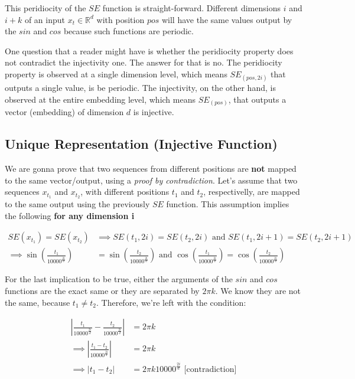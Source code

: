 \documentclass{article}
\begin{document}
This peridiocity of the $SE$ function is straight-forward. Different dimensions $i$ and $i+k$ of an input  $x_t \in \mathbb{R}^{d}$ with position $pos$ will have the same values output by the $sin$ and $cos$ because such functions are periodic. 

\begin{info} %
	One question that a reader might have is whether the peridiocity property does not contradict the injectivity one. The answer for that is no. The peridiocity property is observed at a single dimension level, which means $SE_{(pos, 2i)}$ that outputs a single value, is be periodic. The injectivity, on the other hand, is observed at the entire embedding level, which means $SE_{(pos)}$, that outputs a vector (embedding) of dimension $d$ is injective.
\end{info}


\subsection{Unique Representation (Injective Function)}

We are gonna prove that two sequences from different positions are \textbf{not} mapped to the same vector/output, using a \textit{proof by contradiction}. 
Let's assume that two sequences $x_{t_1}$ and $x_{t_2}$, with different positions $t_1$ and $t_2$, respectivelly, are mapped to the same output using the previously  $SE$ function. This assumption implies the following \textbf{for any dimension i}

\begin{align}
	SE(x_{t_1}) = SE(x_{t_2}) & \implies SE(t_1, 2i) = SE(t_2, 2i) \text{   and   }SE(t_1, 2i+1) = SE(t_2, 2i+1) \\
	 \implies \sin\left(\frac{t_1}{10000^{\frac{2i}{d}}}\right) &= \sin\left(\frac{t_2}{10000^{\frac{2i}{d}}}\right) \text{   and   }\cos\left(\frac{t_1}{10000^{\frac{2i}{d}}}\right) = \cos\left(\frac{t_2}{10000^{\frac{2i}{d}}}\right) 
\end{align}


For the last implication to be true, either the arguments of the $sin$ and $cos$ functions are the exact same or they are separated by $2\pi k$. We know they are not the same, because $t_1 \neq t_2$. Therefore, we're left with the condition:


\begin{align}
	| \frac{t_1}{10000^{\frac{2i}{d}}} - \frac{t_2}{10000^{\frac{2i}{d}}} | &=  2\pi k \\
	\implies 	| \frac{t_1 - t_2}{10000^{\frac{2i}{d}}} | &=  2\pi k \\
	\implies 	| t_1 - t_2 | &=  2\pi k 10000^{\frac{2i}{d}}  \text{       [contradiction]} \\ 
\end{align}
\end{document}
